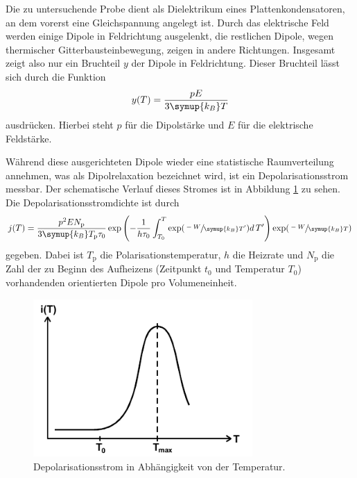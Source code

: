 Die zu untersuchende Probe dient als Dielektrikum eines Plattenkondensatoren, an dem vorerst eine Gleichspannung angelegt ist.
Durch das elektrische Feld werden einige Dipole in Feldrichtung ausgelenkt, die restlichen Dipole, wegen thermischer Gitterbausteinbewegung, zeigen
in andere Richtungen. Insgesamt zeigt also nur ein Bruchteil $y$ der Dipole in Feldrichtung.
Dieser Bruchteil lässt sich durch die Funktion
\begin{equation}
    y(T)=\frac{pE}{3\symup{k_B}T}
\end{equation}
ausdrücken.
Hierbei steht $p$ für die Dipolstärke und $E$ für die elektrische Feldstärke.

Während diese ausgerichteten Dipole wieder eine statistische Raumverteilung annehmen, was als Dipolrelaxation bezeichnet wird, ist ein Depolarisationsstrom messbar.
Der schematische Verlauf dieses Stromes ist in Abbildung \ref{fig:Strom} zu sehen.
Die Depolarisationsstromdichte ist durch
\begin{equation}
\label{eqn:Stromdichte}
    j(T)=\frac{p^2 E N_\text{p}}{3 \symup{k_B} T_\text{p}\tau_0}\exp\left(-\frac{1}{h\tau_0}\int_{T_0}^{T}\exp(\sfrac{-W}{\symup{k_B}T'})d\,T'\right)\exp(\sfrac{-W}{\symup{k_B}T})
\end{equation}
gegeben.
Dabei ist $T_\text{p}$ die Polarisationstemperatur, $h$ die Heizrate und $N_\text{p}$ die Zahl der zu Beginn des Aufheizens (Zeitpunkt $t_0$ und Temperatur $T_0$) vorhandenden orientierten Dipole pro Volumeneinheit.
\begin{figure}[htb]
    \centering
    \includegraphics[height=6cm]{pics/Strom.png}
    \caption{Depolarisationsstrom in Abhängigkeit von der Temperatur. \cite{anleitung}}
    \label{fig:Strom}
\end{figure}
\FloatBarrier


\FloatBarrier